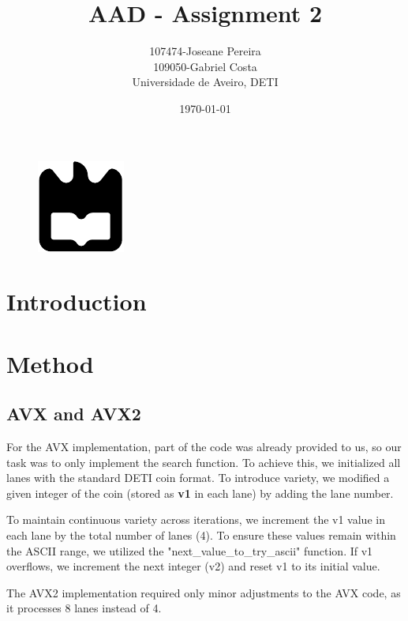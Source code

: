 \documentclass[a4paper,12pt]{article}
\title{AAD - Assignment 2}
\author{107474-Joseane Pereira \\
109050-Gabriel Costa \\
Universidade de Aveiro, DETI}
\date{\today}
\begin{document}
\begin{figure}
    \centering
    \includegraphics[width=0.3\linewidth]{ua.pdf}
    \label{fig:enter-label}
\end{figure}
\maketitle
\newpage
\tableofcontents
\newpage

\section{Introduction}
\label{sec:introduction}



\section{Method}
\label{sec:method}
\subsection{AVX and AVX2}
\label{subsec:avx}

For the AVX implementation, part of the code was already provided to us, so our task was to only implement the search function. To achieve this, we initialized all lanes with the standard DETI coin format. To introduce variety, we modified a given integer of the coin (stored as \textbf{v1} in each lane) by adding the lane number.

To maintain continuous variety across iterations, we increment the v1 value in each lane by the total number of lanes (4). To ensure these values remain within the ASCII range, we utilized the "next\_value\_to\_try\_ascii" function. If v1 overflows, we increment the next integer (v2) and reset v1 to its initial value.

The AVX2 implementation required only minor adjustments to the AVX code, as it processes 8 lanes instead of 4.
\end{document}
